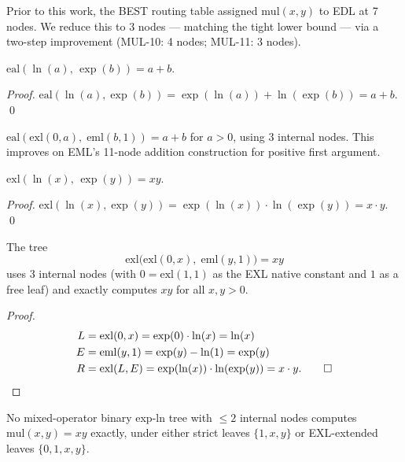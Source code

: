 Prior to this work, the BEST routing table assigned $\mathrm{mul}(x,y)$
to EDL at 7 nodes. We reduce this to 3 nodes — matching the tight lower bound —
via a two-step improvement (MUL-10: 4 nodes; MUL-11: 3 nodes).

\begin{theorem}
$\mathrm{eal}(\ln(a),\, \exp(b)) = a + b$.
\end{theorem}

\begin{proof}
$\mathrm{eal}(\ln(a), \exp(b))
 = \exp(\ln(a)) + \ln(\exp(b))
 = a + b$. \qed
\end{proof}

\begin{corollary}
$\mathrm{eal}(\mathrm{exl}(0,a),\; \mathrm{eml}(b, 1)) = a + b$
for $a > 0$, using 3 internal nodes.
This improves on EML's 11-node addition construction for positive first argument.
\end{corollary}

\begin{theorem}
$\mathrm{exl}(\ln(x),\, \exp(y)) = xy$.
\end{theorem}

\begin{proof}
$\mathrm{exl}(\ln(x), \exp(y))
 = \exp(\ln(x)) \cdot \ln(\exp(y))
 = x \cdot y$. \qed
\end{proof}

\begin{theorem}
\label{thm:mul3n}
The tree
\[
  \mathrm{exl}\!\bigl(\mathrm{exl}(0, x),\;\mathrm{eml}(y, 1)\bigr) = xy
\]
uses 3 internal nodes (with $0 = \mathrm{exl}(1,1)$ as the EXL native constant
and $1$ as a free leaf) and exactly computes $xy$ for all $x, y > 0$.
\end{theorem}

\begin{proof}
\begin{align*}
  L &= \mathrm{exl}(0, x) = \exp(0)\cdot\ln(x) = \ln(x) \\
  E &= \mathrm{eml}(y, 1) = \exp(y) - \ln(1) = \exp(y) \\
  R &= \mathrm{exl}(L, E) = \exp(\ln(x))\cdot\ln(\exp(y)) = x \cdot y. \qed
\end{align*}
\end{proof}

\begin{theorem}
\label{thm:mul3lb}
No mixed-operator binary exp-ln tree with $\leq 2$ internal nodes computes
$\mathrm{mul}(x,y) = xy$ exactly, under either strict leaves $\{1, x, y\}$
or EXL-extended leaves $\{0, 1, x, y\}$.
\end{theorem}

